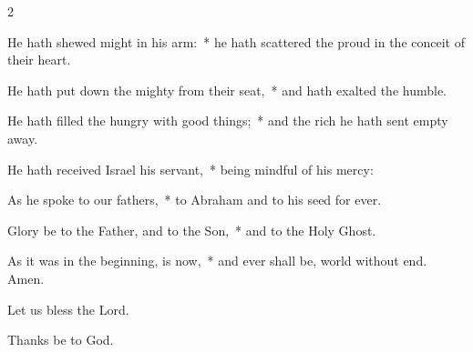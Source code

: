 \documentclass[12pt]{book}
\begin{document}
\begin{paracol}{2}
\begin{enpars}
He hath shewed might in his arm:~* he hath scattered the proud in the conceit of their heart.

He hath put down the mighty from their seat,~* and hath exalted the humble.

He hath filled the hungry with good things;~* and the rich he hath sent empty away.

He hath received Israel his servant,~* being mindful of his mercy:

As he spoke to our fathers,~* to Abraham and to his seed for ever.

Glory be to the Father, and to the Son,~* and to the Holy Ghost.

As it was in the beginning, is now,~* and ever shall be, world without end. Amen.
\end{enpars}
 \end{paracol}









\noindent \vv Let us bless the Lord.

\noindent \rr Thanks be to God.

    

\end{document}
